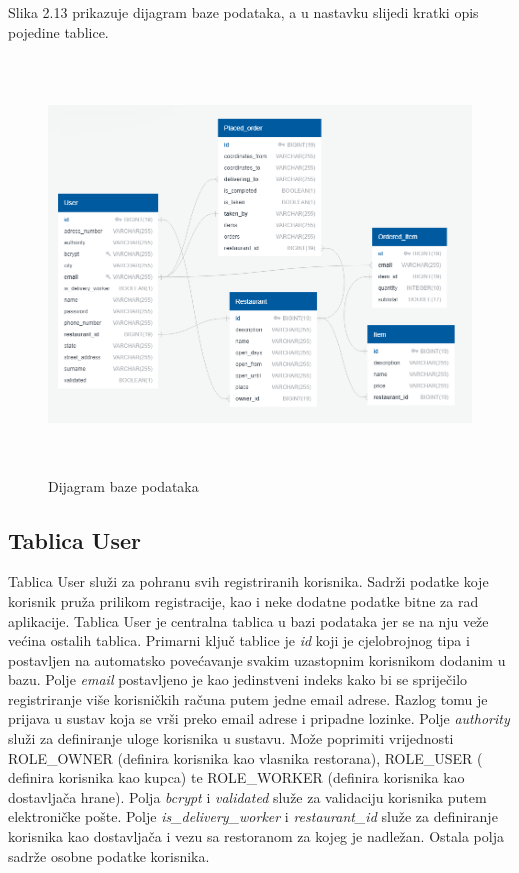 \documentclass[times, utf8, zavrsni, numeric]{fer}
\begin{document}
Slika 2.13 prikazuje dijagram baze podataka, a u nastavku slijedi kratki opis pojedine tablice.
\begin{figure}[htb]
\centering
\includegraphics[height=11cm]{database.png}
\caption{Dijagram baze podataka}
\label{fig:db}
\end{figure}
\subsection{Tablica User}
Tablica User služi za pohranu svih registriranih korisnika. Sadrži podatke koje korisnik pruža prilikom registracije, kao i neke dodatne podatke bitne za rad aplikacije. Tablica User je centralna tablica u bazi podataka jer se na nju veže većina ostalih tablica. Primarni ključ tablice je \emph{id} koji je cjelobrojnog tipa i postavljen na automatsko povećavanje svakim uzastopnim korisnikom dodanim u bazu. Polje \emph{email} postavljeno je kao jedinstveni indeks kako bi se spriječilo registriranje više korisničkih računa putem jedne email adrese. Razlog tomu je prijava u sustav koja se vrši preko email adrese i pripadne lozinke. Polje \emph{authority} služi za definiranje uloge korisnika u sustavu. Može poprimiti vrijednosti ROLE\_OWNER (definira korisnika kao vlasnika restorana), ROLE\_USER ( definira korisnika kao kupca) te ROLE\_WORKER (definira korisnika kao dostavljača hrane). Polja \emph{bcrypt} i \emph{validated} služe za validaciju korisnika putem elektroničke pošte. Polje \emph{is\_delivery\_worker} i \emph{restaurant\_id} služe za definiranje korisnika kao dostavljača i vezu sa restoranom za kojeg je nadležan. Ostala polja sadrže osobne podatke korisnika.
\end{document}
